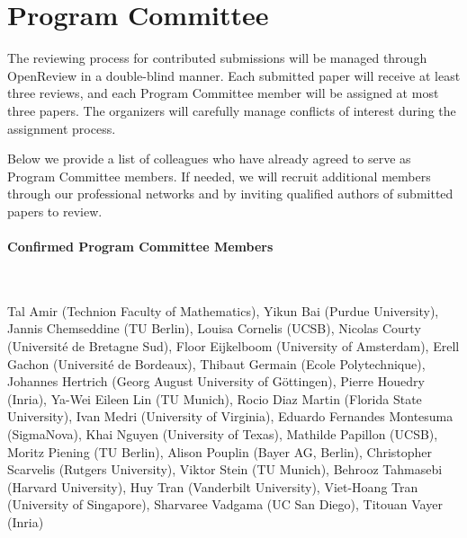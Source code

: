 \documentclass{article}
\begin{document}
\section*{Program Committee}


The reviewing process for contributed submissions will be managed through OpenReview in a double-blind manner. Each submitted paper will receive at least three reviews, and each Program Committee member will be assigned at most three papers. The organizers will carefully manage conflicts of interest during the assignment process.

Below we provide a list of colleagues who have already agreed to serve as Program Committee members. If needed, we will recruit additional members through our professional networks and by inviting qualified authors of submitted papers to review.

\paragraph{Confirmed Program Committee Members} \ 

Tal Amir (Technion Faculty of Mathematics), Yikun Bai (Purdue University), Jannis Chemseddine (TU Berlin), Louisa Cornelis (UCSB), Nicolas Courty (Université de Bretagne Sud), Floor Eijkelboom (University of Amsterdam), Erell Gachon (Université de Bordeaux), Thibaut Germain (Ecole Polytechnique), Johannes Hertrich (Georg August University of Göttingen), Pierre Houedry (Inria), Ya-Wei Eileen Lin (TU Munich), Rocio Diaz Martin (Florida State University), Ivan Medri (University of Virginia), Eduardo Fernandes Montesuma (SigmaNova), Khai Nguyen (University of Texas), Mathilde Papillon (UCSB), Moritz Piening (TU Berlin), Alison Pouplin (Bayer AG, Berlin), Christopher Scarvelis (Rutgers University), Viktor Stein (TU Munich), Behrooz Tahmasebi (Harvard University), Huy Tran (Vanderbilt University), Viet-Hoang Tran (University of Singapore), Sharvaree Vadgama (UC San Diego), Titouan Vayer (Inria)
\end{document}

